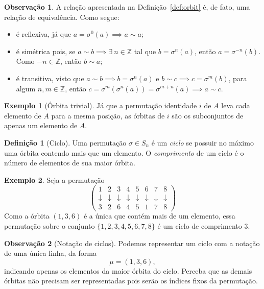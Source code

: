 \documentclass[a4paper,12pt]{report}
\theoremstyle{plain}
\theoremstyle{definition}
\newtheorem{definicao}{Definição}[section]
\newtheorem{observacao}{Observação}[section]
\newtheorem{exemplo}{Exemplo}[section]
\begin{document}
\begin{observacao}
	A relação apresentada na Definição~\ref{def:orbit} é, de fato, uma relação de equivalência. Como segue:
	\begin{itemize}
		\item é reflexiva, já que $a = \sigma^0(a) \implies a\sim a$;
		\item é simétrica pois, se $a\sim b \implies \exists\  n\in \mathbb{Z}$ tal que $b = \sigma^n(a)$, então $a = \sigma^{-n}(b)$. Como $-n\in\mathbb{Z}$, então $b\sim a$;
		\item é transitiva, visto que $a\sim b \implies b=\sigma^n(a)$ e $b \sim c \implies c = \sigma^m(b)$, para algum $n,m\in\mathbb{Z}$, então $c=\sigma^m(\sigma^n(a)) = \sigma^{m+n}(a) \implies a\sim c$.
	\end{itemize}
\end{observacao}

\begin{exemplo}[Órbita trivial]
	Já que a permutação identidade $i$ de $A$ leva cada elemento de $A$ para a mesma posição, as órbitas de $i$ são os subconjuntos de apenas um elemento de $A$.
\end{exemplo}

\begin{definicao}[Ciclo]
	Uma permutação $\sigma\in S_n$ é um \emph{ciclo} se possuir no máximo uma órbita contendo mais que um elemento. O \emph{comprimento} de um ciclo é o número de elementos de sua maior órbita.
\end{definicao}

\begin{exemplo}
	Seja a permutação 
	$$
	\begin{pmatrix}
		1 & 2 & 3 & 4 & 5 & 6 & 7 & 8\\
		\downarrow & \downarrow & \downarrow & \downarrow & \downarrow & \downarrow & \downarrow & \downarrow\\
		3 & 2 & 6 & 4 & 5 & 1 & 7 & 8
	\end{pmatrix}
	$$
	Como a órbita $(1,3,6)$ é a única que contém mais de um elemento, essa permutação sobre o conjunto $\{1,2,3,4,5,6,7,8\}$ é um ciclo de comprimento 3.
\end{exemplo}

\begin{observacao}[Notação de ciclos]
	Podemos representar um ciclo com a notação de uma única linha, da forma $$\mu = (1,3,6),$$ indicando apenas os elementos da maior órbita do ciclo. Perceba que as demais órbitas não precisam ser representadas pois serão os índices fixos da permutação.
\end{observacao}
\end{document}
